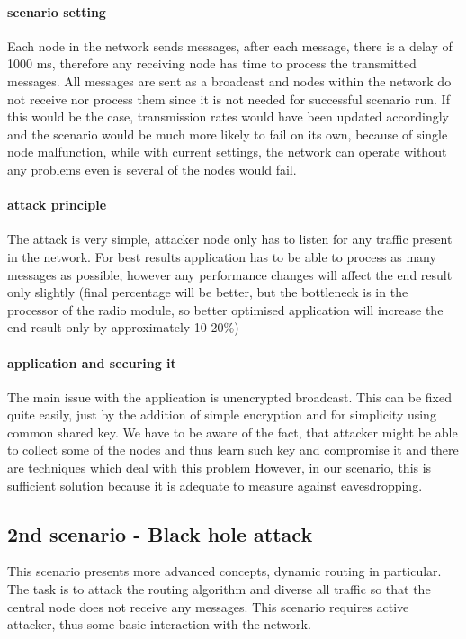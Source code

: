 \documentclass[
  digital, %
  table,   %
  nolof,     %
  nolot,     %
           oneside
]{fithesis3}
\begin{document}
    \paragraph{scenario setting}
    Each node in the network sends messages, after each message, there is a delay of 1000 ms, therefore any receiving node has time to process the transmitted messages. All messages are sent as a broadcast and nodes within the network do not receive nor process them since it is not needed for successful scenario run. If this would be the case, transmission rates would have been updated accordingly and the scenario would be much more likely to fail on its own, because of single node malfunction, while with current settings, the network can operate without any problems even is several of the nodes would fail.

    \paragraph{attack principle}
    The attack is very simple, attacker node only has to listen for any traffic present in the network. For best results application has to be able to process as many messages as possible, however any performance changes will affect the end result only slightly (final percentage will be better, but the bottleneck is in the processor of the radio module, so better optimised application will increase the end result only by approximately 10-20\%)
    \paragraph{application and securing it}
    The main issue with the application is unencrypted broadcast. This can be fixed quite easily, just by the addition of simple encryption and for simplicity using common shared key. We have to be aware of the fact, that attacker might be able to collect some of the nodes and thus learn such key and compromise it and there are techniques which deal with this problem %
    However, in our scenario, this is sufficient solution because it is adequate to measure against eavesdropping.

    \subsection{2nd scenario - Black hole attack} \label{subsec:2nd}
    This scenario presents more advanced concepts, dynamic routing in particular. The task is to attack the routing algorithm and diverse all traffic so that the central node does not receive any messages. This scenario requires active attacker, thus some basic interaction with the network.
\end{document}

